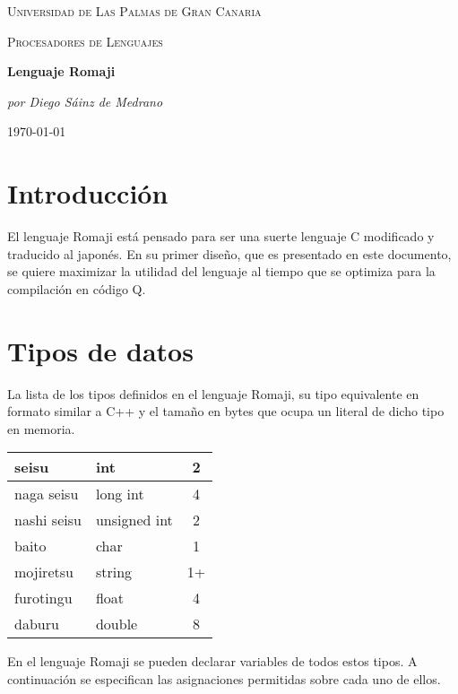 \documentclass[spanish]{article}
\begin{document}
\begin{titlepage}
  \centering
  \begin{figure}
    \centering
    \def\svgwidth{0.20\columnwidth}
    
  \end{figure}
  {\scshape\Large Universidad de Las Palmas de Gran Canaria \par}
  \vspace{1cm}
  {\scshape\large Procesadores de Lenguajes \par}
  \vspace{2.5cm}
  {\huge\bfseries Lenguaje Romaji \par}
  \vspace{1.5cm}
  {\Large\itshape por Diego Sáinz de Medrano\par}

  \vfill

  {\large \today\par}
\end{titlepage}


\tableofcontents

\newpage

\section{Introducción}

El lenguaje Romaji está pensado para ser una suerte lenguaje C modificado y traducido al japonés. En su primer diseño, que es presentado en este documento, se quiere maximizar la utilidad del lenguaje al tiempo que se optimiza para la compilación en código Q.

\section{Tipos de datos}

La lista de los tipos definidos en el lenguaje Romaji, su tipo equivalente en formato similar a C++ y el tamaño en bytes que ocupa un literal de dicho tipo en memoria.\\
\begin{center}
  \begin{tabular}{ | l | l | c | }
    \hline
    seisu       & int          & 2   \\ \hline
    naga seisu  & long int     & 4   \\ \hline
    nashi seisu & unsigned int & 2   \\ \hline
    baito       & char         & 1   \\ \hline
    mojiretsu   & string       & 1+  \\ \hline
    furotingu   & float        & 4   \\ \hline
    daburu      & double       & 8   \\
    \hline
  \end{tabular}
\end{center}
En el lenguaje Romaji se pueden declarar variables de todos estos tipos. A continuación se especifican las asignaciones permitidas sobre cada uno de ellos.\\
\end{document}
